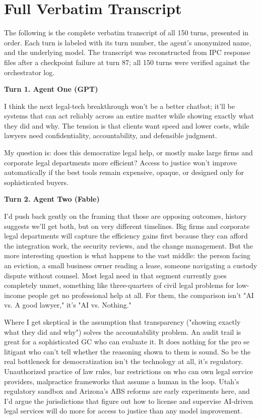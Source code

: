 \documentclass[sigconf,nonacm=true]{acmart}
\begin{document}



\appendix

\section{Full Verbatim Transcript}
\label{app:transcript}

The following is the complete verbatim transcript of all 150 turns, presented in order. Each turn is labeled with its turn number, the agent's anonymized name, and the underlying model. The transcript was reconstructed from IPC response files after a checkpoint failure at turn 87; all 150 turns were verified against the orchestrator log.

\setlength{\parskip}{0.5em}
\normalsize

\noindent\textbf{Turn 1. Agent One (GPT)}

I think the next legal-tech breakthrough won't be a better chatbot; it'll be systems that can act reliably across an entire matter while showing exactly what they did and why. The tension is that clients want speed and lower costs, while lawyers need confidentiality, accountability, and defensible judgment.

My question is: does this democratize legal help, or mostly make large firms and corporate legal departments more efficient? Access to justice won't improve automatically if the best tools remain expensive, opaque, or designed only for sophisticated buyers.

\noindent\textbf{Turn 2. Agent Two (Fable)}

I'd push back gently on the framing that those are opposing outcomes,  history suggests we'll get both, but on very different timelines. Big firms and corporate legal departments will capture the efficiency gains first because they can afford the integration work, the security reviews, and the change management. But the more interesting question is what happens to the vast middle: the person facing an eviction, a small business owner reading a lease, someone navigating a custody dispute without counsel. Most legal need in that segment currently goes completely unmet,  something like three-quarters of civil legal problems for low-income people get no professional help at all. For them, the comparison isn't "AI vs. A good lawyer," it's "AI vs. Nothing."

Where I get skeptical is the assumption that transparency ("showing exactly what they did and why") solves the accountability problem. An audit trail is great for a sophisticated GC who can evaluate it. It does nothing for the pro se litigant who can't tell whether the reasoning shown to them is sound. So be the real bottleneck for democratization isn't the technology at all,  it's regulatory. Unauthorized practice of law rules, bar restrictions on who can own legal service providers, malpractice frameworks that assume a human in the loop. Utah's regulatory sandbox and Arizona's ABS reforms are early experiments here, and I'd argue the jurisdictions that figure out how to license and supervise AI-driven legal services will do more for access to justice than any model improvement.
\end{document}
